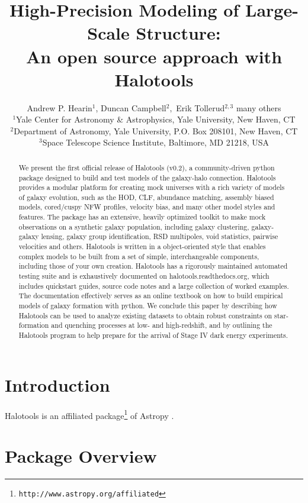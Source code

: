 \documentclass[usenatbib,usegraphicx,letterpaper]{mn2e}
\title[Presenting Halotools]
{
High-Precision Modeling of Large-Scale Structure: \\An open source approach with Halotools}
\author[Hearin et al.]
{Andrew P. Hearin$^{1}$, Duncan Campbell$^{2},$ Erik Tollerud$^{2,3}$\newauthor
many others \\
$^1$Yale Center for Astronomy \& Astrophysics, Yale University, New Haven, CT\\
$^2$Department of Astronomy, Yale University, P.O. Box 208101, New Haven, CT\\
$^3$Space Telescope Science Institute, Baltimore, MD 21218, USA}
\begin{document}
\maketitle

\begin{abstract}

We  present the first official release of Halotools (v0.2), a community-driven python package designed to build and test models of the galaxy-halo connection. Halotools provides a modular platform for creating mock universes with a rich variety of models of galaxy evolution, such as the HOD, CLF, abundance matching, assembly biased models, cored/cuspy NFW profiles, velocity bias, and many other model styles and features. The package has an extensive, heavily optimized toolkit to make mock observations on a synthetic galaxy population, including galaxy clustering, galaxy-galaxy lensing, galaxy group identification, RSD multipoles, void statistics, pairwise velocities and others. Halotools is written in a object-oriented style that enables complex models to be built from a set of simple, interchangeable components, including those of your own creation. Halotools has a rigorously maintained automated testing suite and is exhaustively documented on halotools.readthedocs.org, which includes quickstart guides, source code notes and a large collection of worked examples. The documentation effectively serves as an online textbook on how to build empirical models of galaxy formation with python. We conclude this paper by describing how Halotools can be used to analyze existing datasets to obtain robust constraints on star-formation and quenching processes at low- and high-redshift, and by outlining the Halotools program to help prepare for the arrival of Stage IV dark energy experiments.

\end{abstract} 

\section{Introduction}
\label{section:introduction}

Halotools is an affiliated package\footnote{\tt http://www.astropy.org/affiliated} of Astropy \citep{astropy}.

\section{Package Overview}
\label{section:overview}
\end{document}

